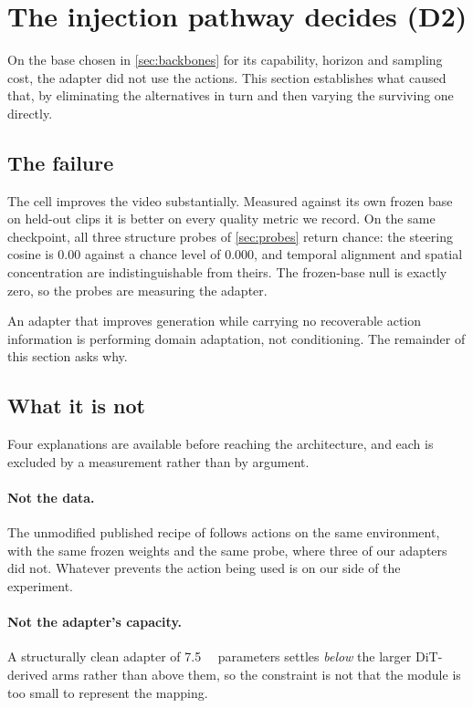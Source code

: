 \section{The injection pathway decides (D2)}
\label{sec:res-pathway}

On the base chosen in \cref{sec:backbones} for its capability, horizon and
sampling cost, the adapter did not use the actions. This section establishes
what caused that, by eliminating the alternatives in turn and then varying
the surviving one directly.

\subsection{The failure}

The cell improves the video substantially. Measured against its own frozen
base on held-out clips it is better on every quality metric we
record.
On the same checkpoint, all three structure probes of \cref{sec:probes}
return chance: the steering cosine is $0.00$ against a chance level of
$0.000$, and temporal alignment and spatial concentration are
indistinguishable from theirs. The frozen-base null is exactly zero, so the
probes are measuring the adapter.

An adapter that improves generation while carrying no recoverable action
information is performing domain adaptation, not conditioning. The remainder
of this section asks why.

\subsection{What it is not}

Four explanations are available before reaching the architecture, and each
is excluded by a measurement rather than by argument.

\paragraph{Not the data.} The unmodified published recipe of
\citet{rigter2024avid} follows actions on the same environment, with
the same frozen weights and the same probe, where three of our adapters did
not. Whatever prevents the action
being used is on our side of the experiment.

\paragraph{Not the adapter's capacity.} A structurally clean adapter of
\SI{7.5}{\mega\nothing} parameters settles \emph{below} the larger
DiT-derived arms rather than above them, so the constraint is not that the
module is too small to represent the mapping.

